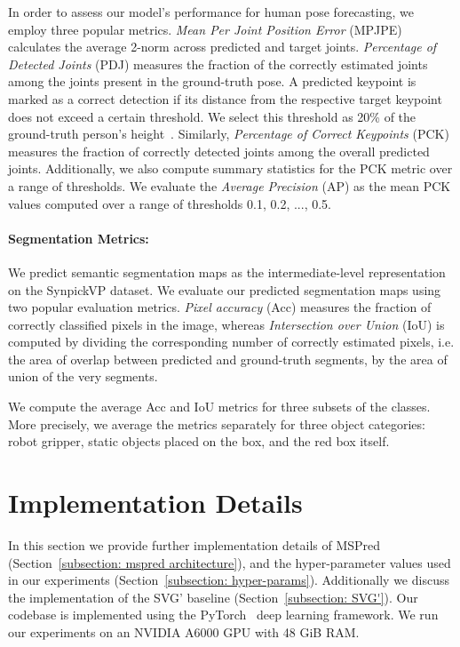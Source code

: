 \documentclass{bmvc2k}
\newcommand{\Section}[1]{Section~\ref{#1}}
\begin{document}
In order to assess our model’s performance for human pose forecasting, we employ three popular metrics.
\emph{Mean Per Joint Position Error} (MPJPE) calculates the average 2-norm across predicted and target joints.
\emph{Percentage of Detected Joints} (PDJ) measures the fraction of the correctly estimated joints among the joints present in the ground-truth pose. A predicted keypoint is marked as a correct detection if its distance from the respective target keypoint does not exceed a certain threshold. We select this threshold as 20\% of the ground-truth person's height~\cite{Sapp_MultimodalDecomposableModelsForHumanPoseEstimation_2013}.
Similarly, \emph{Percentage of Correct Keypoints} (PCK) measures the fraction of correctly detected joints among the overall predicted joints.
Additionally, we also compute summary statistics for the PCK metric over
a range of thresholds. We evaluate the \emph{Average Precision} (AP)
as the mean PCK values computed over a range of thresholds {0.1, 0.2, ..., 0.5}.

\vspace*{-0cm}
\paragraph{Segmentation Metrics:} We predict semantic segmentation maps as the intermediate-level representation on the SynpickVP dataset.
We evaluate our predicted segmentation maps using two popular evaluation metrics.
\emph{Pixel accuracy} (Acc) measures the fraction of correctly classified pixels in the image, whereas \emph{Intersection over Union} (IoU) is computed by dividing the corresponding number of correctly estimated pixels, i.e. the area of overlap between predicted and ground-truth segments, by the area of union of the very segments.

We compute the average Acc and IoU metrics for three subsets of the classes. More precisely, we average the metrics separately for three object categories: robot gripper, static objects placed on the box, and the red box itself.



\section{Implementation Details}
\label{section: implementation details}

In this section we provide further implementation details of MSPred (\Section{subsection: mspred architecture}), and the hyper-parameter values used in our experiments (\Section{subsection: hyper-params}). Additionally we discuss the implementation of the SVG' baseline (\Section{subsection: SVG'}).
Our codebase is implemented using the PyTorch~\cite{Paszke_AutomaticDifferneciationInPytorch_2017} deep learning framework.
We run our experiments on an NVIDIA A6000 GPU with 48 GiB RAM.
\end{document}
